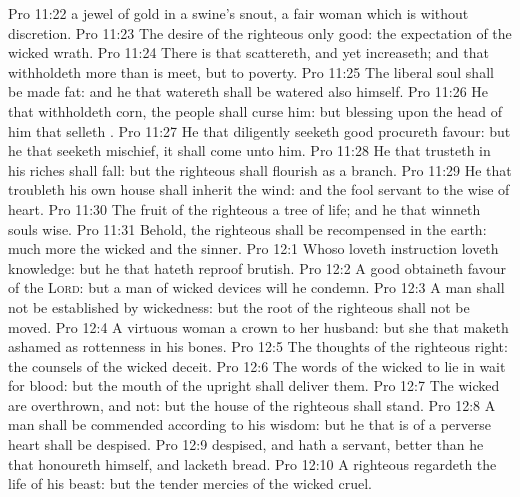 \vs Pro 11:22  a jewel of gold in a swine's snout,  a fair woman which is without discretion.
\vs Pro 11:23 The desire of the righteous  only good:  the expectation of the wicked  wrath.
\vs Pro 11:24 There is that scattereth, and yet increaseth; and  that withholdeth more than is meet, but  to poverty.
\vs Pro 11:25 The liberal soul shall be made fat: and he that watereth shall be watered also himself.
\vs Pro 11:26 He that withholdeth corn, the people shall curse him: but blessing  upon the head of him that selleth .
\vs Pro 11:27 He that diligently seeketh good procureth favour: but he that seeketh mischief, it shall come unto him.
\vs Pro 11:28 He that trusteth in his riches shall fall: but the righteous shall flourish as a branch.
\vs Pro 11:29 He that troubleth his own house shall inherit the wind: and the fool  servant to the wise of heart.
\vs Pro 11:30 The fruit of the righteous  a tree of life; and he that winneth souls  wise.
\vs Pro 11:31 Behold, the righteous shall be recompensed in the earth: much more the wicked and the sinner.
\vs Pro 12:1 Whoso loveth instruction loveth knowledge: but he that hateth reproof  brutish.
\vs Pro 12:2 A good  obtaineth favour of the \textsc{Lord}: but a man of wicked devices will he condemn.
\vs Pro 12:3 A man shall not be established by wickedness: but the root of the righteous shall not be moved.
\vs Pro 12:4 A virtuous woman  a crown to her husband: but she that maketh ashamed  as rottenness in his bones.
\vs Pro 12:5 The thoughts of the righteous  right:  the counsels of the wicked  deceit.
\vs Pro 12:6 The words of the wicked  to lie in wait for blood: but the mouth of the upright shall deliver them.
\vs Pro 12:7 The wicked are overthrown, and  not: but the house of the righteous shall stand.
\vs Pro 12:8 A man shall be commended according to his wisdom: but he that is of a perverse heart shall be despised.
\vs Pro 12:9  despised, and hath a servant,  better than he that honoureth himself, and lacketh bread.
\vs Pro 12:10 A righteous  regardeth the life of his beast: but the tender mercies of the wicked  cruel.
